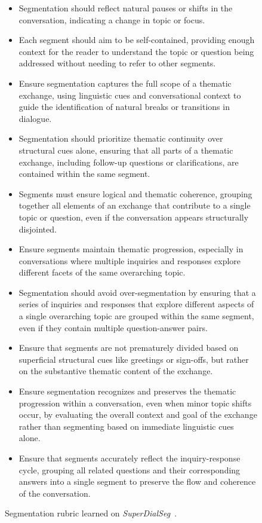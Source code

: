 \begin{figure}[htbp]
    \small
    \vspace{-5mm}
    \begin{tcolorbox}[left=3pt,right=3pt,top=3pt,bottom=3pt,title=\textbf{Segmentation rubric learned from \textit{SuperDialSeg}}]
\begin{itemize}
    \item Segmentation should reflect natural pauses or shifts in the conversation, indicating a change in topic or focus.
    \item Each segment should aim to be self-contained, providing enough context for the reader to understand the topic or question being addressed without needing to refer to other segments.
    \item Ensure segmentation captures the full scope of a thematic exchange, using linguistic cues and conversational context to guide the identification of natural breaks or transitions in dialogue.
    \item Segmentation should prioritize thematic continuity over structural cues alone, ensuring that all parts of a thematic exchange, including follow-up questions or clarifications, are contained within the same segment.
    \item Segments must ensure logical and thematic coherence, grouping together all elements of an exchange that contribute to a single topic or question, even if the conversation appears structurally disjointed.
    \item Ensure segments maintain thematic progression, especially in conversations where multiple inquiries and responses explore different facets of the same overarching topic.
    \item Segmentation should avoid over-segmentation by ensuring that a series of inquiries and responses that explore different aspects of a single overarching topic are grouped within the same segment, even if they contain multiple question-answer pairs.
    \item Ensure that segments are not prematurely divided based on superficial structural cues like greetings or sign-offs, but rather on the substantive thematic content of the exchange.
    \item Ensure segmentation recognizes and preserves the thematic progression within a conversation, even when minor topic shifts occur, by evaluating the overall context and goal of the exchange rather than segmenting based on immediate linguistic cues alone.
    \item Ensure that segments accurately reflect the inquiry-response cycle, grouping all related questions and their corresponding answers into a single segment to preserve the flow and coherence of the conversation.
\end{itemize}
\end{tcolorbox}
\caption{Segmentation rubric learned on \textit{SuperDialSeg}~\citep{jiang2023superdialseg}.}
\label{fig: segmentation_rubric_superseg}
\end{figure}